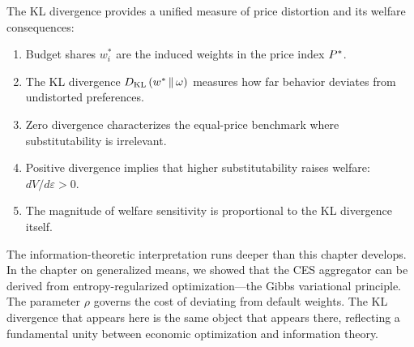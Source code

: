 The KL divergence provides a unified measure of price distortion and its welfare consequences:

\begin{enumerate}[leftmargin=2em]
    \item Budget shares $w_i^*$ are the induced weights in the price index $P^{*}$.
    
    \item The KL divergence $D_{\mathrm{KL}}\left(w^* \,\|\, \omega\right)$ measures how far behavior deviates from undistorted preferences.
    
    \item Zero divergence characterizes the equal-price benchmark where substitutability is irrelevant.
    
    \item Positive divergence implies that higher substitutability raises welfare: $dV/d\varepsilon > 0$.
    
    \item The magnitude of welfare sensitivity is proportional to the KL divergence itself.
\end{enumerate}

\begin{callouttip}
The information-theoretic interpretation runs deeper than this chapter develops. In the chapter on generalized means, we showed that the CES aggregator can be derived from entropy-regularized optimization---the Gibbs variational principle. The parameter $\rho$ governs the cost of deviating from default weights. The KL divergence that appears here is the same object that appears there, reflecting a fundamental unity between economic optimization and information theory.
\end{callouttip}
